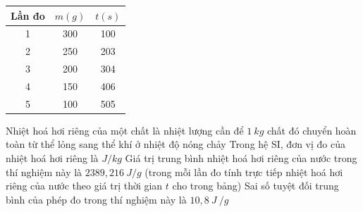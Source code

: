 \begin{ex}%
	{\begin{tabular}{|c|c|c|}
			\hline Lần đo&$m(g)$&$t(s)$ \\
			\hline 1&300&100 \\
			\hline 2&250&203 \\
			\hline 3&200&304 \\
			\hline 4&150&406 \\
			\hline 5&100&505 \\
			\hline
		\end{tabular}
	}
	\choiceTFt
	{Nhiệt hoá hơi riêng của một chất là nhiệt lượng cần để $1\ kg$ chất đó chuyển hoàn toàn từ thể lỏng sang thể khí ở nhiệt độ nóng chảy}
	{\True Trong hệ SI, đơn vị đo của nhiệt hoá hơi riêng là $J/kg$}
	{Giá trị trung bình nhiệt hoá hơi riêng của nước trong thí nghiệm này là $2389,216\ J/g$ (trong mỗi lần đo tính trực tiếp nhiệt hoá hơi riêng của nước theo giá trị thời gian $t$ cho trong bảng)}
	{Sai số tuyệt đối trung bình của phép đo trong thí nghiệm này là $10,8 \ J\ /g$}
\end{ex}
